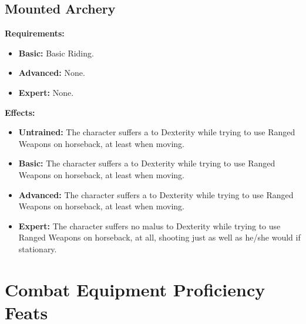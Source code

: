 \documentclass[openany,10pt,a4paper]{book}
\begin{document}
\subsection{Mounted Archery}
\begin{table}[!ht]
\centering
{}
\end{table}
\textbf{Requirements:}
\begin{itemize}
	\item \textbf{Basic:} Basic Riding.
	\item \textbf{Advanced:} None.
	\item \textbf{Expert:} None.
\end{itemize}
\textbf{Effects:}
\begin{itemize}
	\item \textbf{Untrained:} The character suffers a  to Dexterity while trying to use Ranged Weapons on horseback, at least when moving.
	\item \textbf{Basic:} The character suffers a  to Dexterity while trying to use Ranged Weapons on horseback, at least when moving.
	\item \textbf{Advanced:} The character suffers a  to Dexterity while trying to use Ranged Weapons on horseback, at least when moving.
	\item \textbf{Expert:} The character suffers no malus to Dexterity while trying to use Ranged Weapons on horseback, at all, shooting just as well as he/she would if stationary.
\end{itemize}\newpage
\section{Combat Equipment Proficiency Feats}
\end{document}
